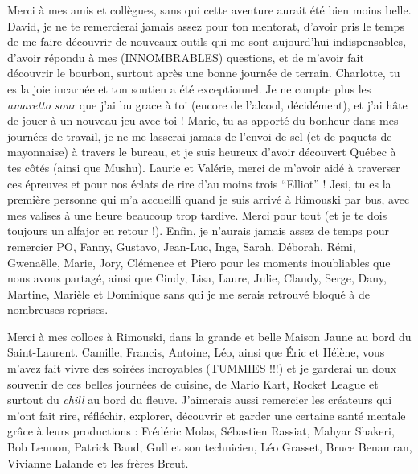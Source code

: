 Merci à mes amis et collègues, sans qui cette aventure aurait été bien
moins belle. David, je ne te remercierai jamais assez pour ton mentorat,
d'avoir pris le temps de me faire découvrir de nouveaux outils qui me
sont aujourd'hui indispensables, d'avoir répondu à mes (INNOMBRABLES)
questions, et de m'avoir fait découvrir le bourbon, surtout après une
bonne journée de terrain. Charlotte, tu es la joie incarnée et ton
soutien a été exceptionnel. Je ne compte plus les \emph{amaretto sour}
que j'ai bu grace à toi (encore de l'alcool, décidément), et j'ai hâte
de jouer à un nouveau jeu avec toi ! Marie, tu as apporté du bonheur
dans mes journées de travail, je ne me lasserai jamais de l'envoi de sel
(et de paquets de mayonnaise) à travers le bureau, et je suis heureux
d'avoir découvert Québec à tes côtés (ainsi que Mushu). Laurie et
Valérie, merci de m'avoir aidé à traverser ces épreuves et pour nos
éclats de rire d'au moins trois ``Elliot'' ! Jesi, tu es la première
personne qui m'a accueilli quand je suis arrivé à Rimouski par bus, avec
mes valises à une heure beaucoup trop tardive. Merci pour tout (et je te
dois toujours un alfajor en retour !). Enfin, je n'aurais jamais assez
de temps pour remercier PO, Fanny, Gustavo, Jean-Luc, Inge, Sarah,
Déborah, Rémi, Gwenaëlle, Marie, Jory, Clémence et Piero pour les
moments inoubliables que nous avons partagé, ainsi que Cindy, Lisa,
Laure, Julie, Claudy, Serge, Dany, Martine, Marièle et Dominique sans
qui je me serais retrouvé bloqué à de nombreuses reprises.

Merci à mes collocs à Rimouski, dans la grande et belle Maison Jaune au
bord du Saint-Laurent. Camille, Francis, Antoine, Léo, ainsi que Éric et
Hélène, vous m'avez fait vivre des soirées incroyables (TUMMIES !!!) et
je garderai un doux souvenir de ces belles journées de cuisine, de Mario
Kart, Rocket League et surtout du \emph{chill} au bord du fleuve.
J'aimerais aussi remercier les créateurs qui m'ont fait rire, réfléchir,
explorer, découvrir et garder une certaine santé mentale grâce à leurs
productions : Frédéric Molas, Sébastien Rassiat, Mahyar Shakeri, Bob
Lennon, Patrick Baud, Gull et son technicien, Léo Grasset, Bruce
Benamran, Vivianne Lalande et les frères Breut.

